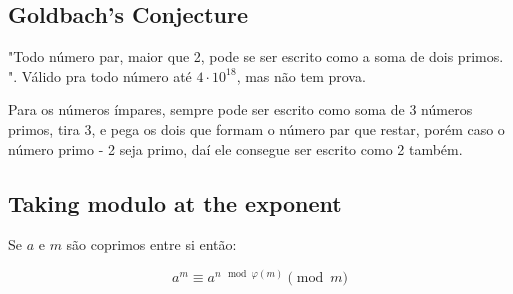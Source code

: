 \subsection{Goldbach's Conjecture}

"Todo número par, maior que 2, pode se ser escrito como a soma de dois primos. ". Válido pra todo número até $4 \cdot 10^{18}$, mas não tem prova.

Para os números ímpares, sempre pode ser escrito como soma de 3 números primos, tira 3, e pega os dois que formam o número par que restar, porém caso o número primo - 2 seja primo, daí ele consegue ser escrito como 2 também.

\subsection{Taking modulo at the exponent}

Se $a$ e $m$ são coprimos entre si então:

\begin{equation}
    a^{m} \equiv a^{n \mod \varphi(m)} \pmod{m}
\end{equation}
